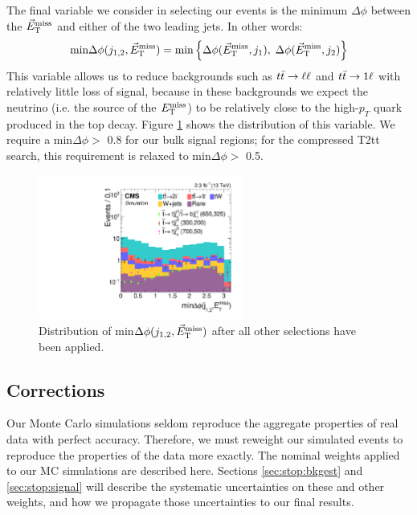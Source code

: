 The final variable we consider in selecting our events is the minimum
$\Delta\phi$ between the $\vec{E}_\text{T}^\text{miss}$ and either of the two leading
jets. In other words:
\begin{equation}
\text{min} \Delta\phi (j_{1,2},\vec{E}_\text{T}^\text{miss}) = \text{min} \left\{ \Delta\phi
    (\vec{E}_\text{T}^\text{miss}, j_1),\; \Delta\phi (\vec{E}_\text{T}^\text{miss}, j_2) \right\}
\end{equation}
This variable allows us to reduce backgrounds such as $t\bar{t} \rightarrow \ell\ell$ and
$t\bar{t} \rightarrow 1\ell$  with relatively little loss of signal, because in these
backgrounds we expect the neutrino (i.e. the source of the $E_\text{T}^\text{miss}$) to
be relatively close to the high-$p_T$ quark produced in the top
decay. Figure \ref{fig:stop:mindphi} shows the distribution of this
variable. We require a min$\Delta\phi >$ 0.8 for our bulk signal
regions; for the compressed T2tt search, this requirement is relaxed
to min$\Delta\phi >$ 0.5.

\begin{figure}
\centering
\includegraphics[width=0.6\textwidth]{figures/nminusone_mindphi.pdf}
\caption{Distribution of min$\Delta\phi (j_{1,2}, \vec{E}_\text{T}^\text{miss})$ after all
  other selections have been applied.}
\label{fig:stop:mindphi}
\end{figure}

\subsection{Corrections}
\label{ssec:stop:corrections}

Our Monte Carlo simulations seldom reproduce the aggregate properties of
real data with perfect accuracy. Therefore, we must reweight our
simulated events to reproduce the properties of the data more
exactly. The nominal weights applied to our MC simulations are
described here. Sections \ref{sec:stop:bkgest} and
\ref{sec:stop:signal} will describe the systematic uncertainties
on these and other weights, and how we propagate those uncertainties
to our final results.

